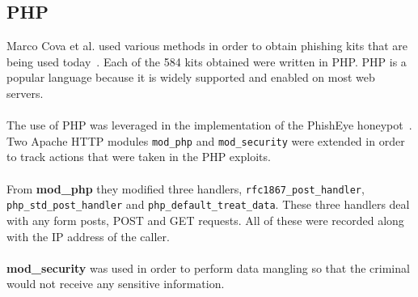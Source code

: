 \documentclass[12pt,twoside]{report}
\begin{document}
\subsection{PHP}
Marco Cova et al. used various methods in order to obtain phishing kits that are being used today~\cite{freephish}. Each of the 584 kits obtained were written in PHP. PHP is a popular language because it is widely supported and enabled on most web servers.
\\\\
The use of PHP was leveraged in the implementation of the PhishEye honeypot~\cite{phisheye}. Two Apache HTTP modules \texttt{mod\_php} and \texttt{mod\_security} were extended in order to track actions that were taken in the PHP exploits.
\\\\
From \textbf{mod\_php} they modified three handlers, \texttt{rfc1867\_post\_handler}, \texttt{php\_std\_post\_handler} and \texttt{php\_default\_treat\_data}. These three handlers deal with any form posts, POST and GET requests. All of these were recorded along with the IP address of the caller.
\\\\
\textbf{mod\_security} was used in order to perform data mangling so that the criminal would not receive any sensitive information.
\end{document}

